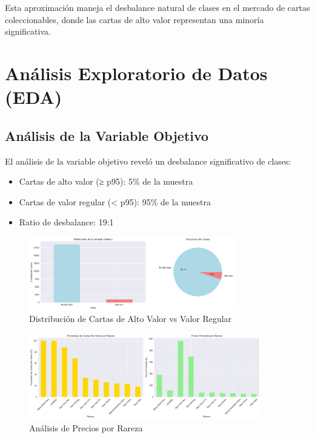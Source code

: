 \documentclass[12pt,letterpaper]{article}
\begin{document}
Esta aproximación maneja el desbalance natural de clases en el mercado de cartas coleccionables, donde las cartas de alto valor representan una minoría significativa.

\section{Análisis Exploratorio de Datos (EDA)}

\subsection{Análisis de la Variable Objetivo}

El análisis de la variable objetivo reveló un desbalance significativo de clases:
\begin{itemize}
    \item Cartas de alto valor (≥ p95): 5\% de la muestra
    \item Cartas de valor regular (< p95): 95\% de la muestra
    \item Ratio de desbalance: 19:1
\end{itemize}

\begin{figure}[H]
\centering
\includegraphics[width=0.8\textwidth]{imagenes/figura_1_distribucion_objetivo.png}
\caption{Distribución de Cartas de Alto Valor vs Valor Regular}
\label{fig:distribucion_objetivo}
\end{figure}

\begin{figure}[H]
\centering
\includegraphics[width=0.9\textwidth]{imagenes/figura_2_precios_por_rareza.png}
\caption{Análisis de Precios por Rareza}
\label{fig:precios_rareza}
\end{figure}
\end{document}
